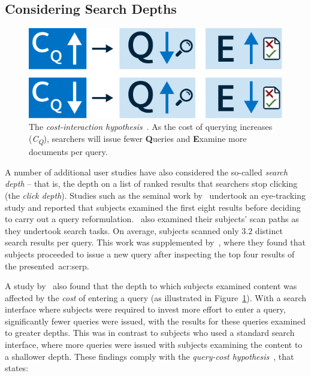 \subsection{Considering Search Depths}\label{sec:stopping_background:user_studies:depths}
\begin{figure}
    \begin{center}
    \vspace*{-7mm}
    \includegraphics[width=1\textwidth]{figures/ch3-query-cost.pdf}
    \end{center}
    \vspace*{-4mm}
    \caption[The cost-interaction hypothesis]{The \emph{cost-interaction hypothesis}~\citep{azzopardi2011economics}. As the cost of querying increases (\emph{C\textsubscript{Q}}), searchers will issue fewer \textbf{Q}ueries and \textbf{E}xamine more documents per query.}
    \label{fig:query_cost}
\end{figure}

A number of additional user studies have also considered the so-called \emph{search depth} -- that is, the depth on a list of ranked results that searchers stop clicking (the \emph{click depth}). Studies such as the seminal work by~\cite{cutrell2007eye_tracking} undertook an eye-tracking study and reported that subjects examined the first eight results before deciding to carry out a query reformulation.~\cite{lorigo2008eye_tracking} also examined their subjects' scan paths as they undertook search tasks. On average, subjects scanned only $3.2$ distinct search results per query. This work was supplemented by~\cite{huang2011no_clicks}, where they found that subjects proceeded to issue a new query after inspecting the top four results of the presented~\gls{acr:serp}.

A study by~\cite{azzopardi2013query_cost} also found that the depth to which subjects examined content was affected by the \emph{cost} of entering a query (as illustrated in Figure~\ref{fig:query_cost}). With a search interface where subjects were required to invest more effort to enter a query, significantly fewer queries were issued, with the results for these queries examined to greater depths. This was in contrast to subjects who used a standard search interface, where more queries were issued with subjects examining the content to a shallower depth. These findings comply with the \emph{query-cost hypothesis}~\citep{azzopardi2011economics}, that states:

